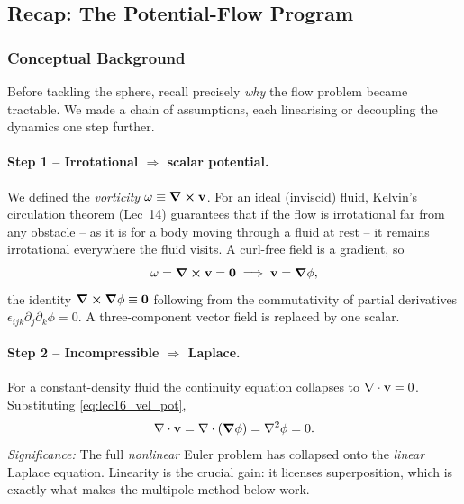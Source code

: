 \documentclass[../main.tex]{subfiles}
\begin{document}
\subsection{Recap: The Potential-Flow Program}\label{sec:lec16:recap}

\subsubsection*{Conceptual Background}
Before tackling the sphere, recall precisely \emph{why} the flow problem became tractable. We made a chain of assumptions, each linearising or decoupling the dynamics one step further.

\paragraph{Step 1 -- Irrotational $\Rightarrow$ scalar potential.}
We defined the \emph{vorticity} $\mathbf{\omega}\equiv\curl\mathbf{v}$. For an ideal (inviscid) fluid, Kelvin's circulation theorem (Lec~14) guarantees that if the flow is irrotational far from any obstacle -- as it is for a body moving through a fluid at rest -- it remains irrotational everywhere the fluid visits. A curl-free field is a gradient, so
\begin{equation}
  \mathbf{\omega}=\curl\mathbf{v}=\mathbf{0}\;\Longrightarrow\;\mathbf{v}=\grad\phi,
  \label{eq:lec16_vel_pot}
\end{equation}
the identity $\curl\grad\phi\equiv\mathbf{0}$ following from the commutativity of partial derivatives $\epsilon_{ijk}\partial_j\partial_k\phi=0$. A three-component vector field is replaced by one scalar.

\paragraph{Step 2 -- Incompressible $\Rightarrow$ Laplace.}
For a constant-density fluid the continuity equation collapses to $\nabla \cdot\mathbf{v}=0$. Substituting \eqref{eq:lec16_vel_pot},
\begin{equation}
  \nabla \cdot\mathbf{v}=\nabla \cdot(\grad\phi)=\nabla^2\phi=0.
  \label{eq:lec16_laplace}
\end{equation}
\textit{Significance:} The full \emph{nonlinear} Euler problem has collapsed onto the \emph{linear} Laplace equation. Linearity is the crucial gain: it licenses superposition, which is exactly what makes the multipole method below work.
\end{document}
